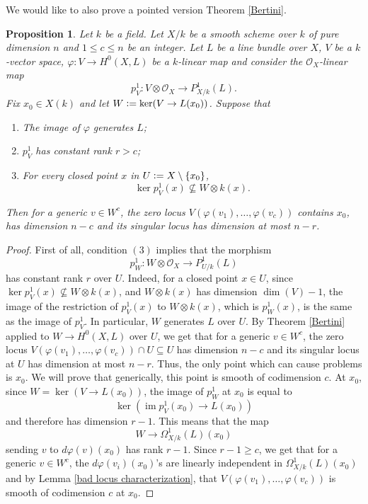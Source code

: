 \documentclass[a4paper,12pt]{amsart}
\newtheorem{proposition}[definition]{Proposition}
\numberwithin{equation}{section}
\newcommand{\defeq}{\vcentcolon=}
\DeclareMathOperator{\im}{\operatorname{im}}
\renewcommand{\leq}{\leqslant}
\renewcommand{\geq}{\geqslant}
\renewcommand{\_}{\rule{0.25cm}{0.4pt}}
\begin{document}
We would like to also prove a pointed version Theorem \ref{Bertini}.

\begin{proposition}\label{Bertini pontuado}
    Let $k$ be a field. Let $X/k$ be a smooth scheme over $k$ of pure dimension $n$ and $1\leq c\leq n$ be an integer. Let $L$ be a line bundle over $X$, $V$ be a $k$-vector space, $\varphi\colon V\to H^{0}(X,L)$ be a $k$-linear map and consider the $\mathcal{O}_{X}$-linear map
    \[
    p^{1}_{V}\colon V\otimes\mathcal{O}_{X}\to P^{1}_{X/k}(L).
    \]
    Fix $x_{0}\in X(k)$ and let $W\defeq \ker(V\to L(x_{0}))$. Suppose that
    \begin{enumerate}
        \item The image of $\varphi$ generates $L$;
        \item $p^{1}_{V}$ has constant rank $r>c$;
        \item For every closed point $x$ in $U\defeq X\setminus \{x_{0}\}$,
        \[
        \ker p^{1}_{V}(x)\not\subseteq W\otimes k(x).
        \]
    \end{enumerate}
    Then for a generic $v\in W^{c}$, the zero locus $V(\varphi(v_{1}),\dots, \varphi(v_{c}))$ contains $x_{0}$, has dimension $n-c$ and its singular locus has dimension at most $n-r$.
\end{proposition}
\begin{proof}
    First of all, condition $(3)$ implies that the morphism
    \[
    p^{1}_{W}\colon W\otimes \mathcal{O}_{X}\to P^{1}_{U/k}(L)
    \]
    has constant rank $r$ over $U$. Indeed, for a closed point $x\in U$, since $\ker p^{1}_{V}(x)\not\subseteq W\otimes k(x)$, and $W\otimes k(x)$ has dimension $\dim(V)-1$, the image of the restriction of $p^{1}_{V}(x)$ to $W\otimes k(x)$, which is $p^{1}_{W}(x)$, is the same as the image of $p^{1}_{V}$. In particular, $W$ generates $L$ over $U$. By Theorem \ref{Bertini} applied to $W\to H^{0}(X,L)$ over $U$, we get that for a generic $v\in W^{c}$, the zero locus $V(\varphi(v_{1}),\dots, \varphi(v_{c}))\cap U\subseteq U$ has dimension $n-c$ and its singular locus at $U$ has dimension at most $n-r$. Thus, the only point which can cause problems is $x_{0}$. We will prove that generically, this point is smooth of codimension $c$. At $x_{0}$, since $W=\ker(V\to L(x_{0}))$, the image of $p^{1}_{W}$ at $x_{0}$ is equal to
    \[
    \ker(\im p^{1}_{V}(x_{0})\to L(x_{0}))
    \]
    and therefore has dimension $r-1$. This means that the map
    \[
    W\to \Omega^{1}_{X/k}(L)(x_{0})
    \]
    sending $v$ to $d\varphi(v)(x_{0})$ has rank $r-1$. Since $r-1\geq c$, we get that for a generic $v\in W^{c}$, the $d\varphi(v_{i})(x_{0})$'s are linearly independent in $\Omega^{1}_{X/k}(L)(x_{0})$ and by Lemma \ref{bad locus characterization}, that $V(\varphi(v_{1}),\dots, \varphi(v_{c}))$ is smooth of codimension $c$ at $x_{0}$.
\end{proof}
\end{document}
